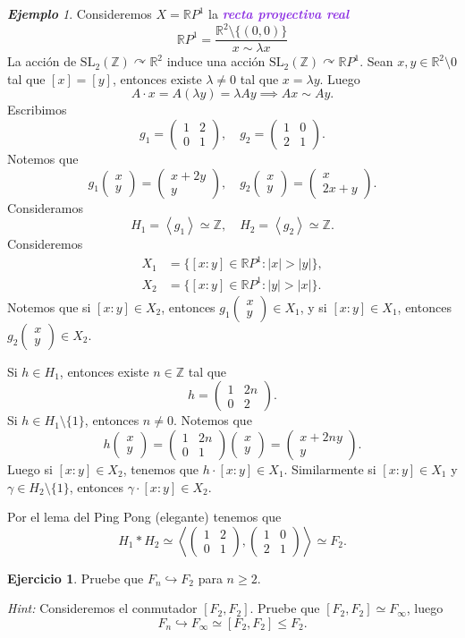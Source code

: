 \documentclass{article}
\theoremstyle{definition}
\newtheorem{exercise}{Ejercicio}
\theoremstyle{remark}
\newtheorem{example}[theorem]{\textbf{Ejemplo}}
\numberwithin{equation}{section}
\newcommand{\R}{\mathbb{R}}
\newcommand{\Z}{\mathbb{Z}}
\newcommand{\lam}{\lambda}
\newcommand{\oo}{\infty}
\newcommand{\embed}{\hookrightarrow}
\newcommand{\acts}{\curvearrowright}
\renewcommand{\c}{\cdot}
\newcommand{\SL}{\mathrm{SL}}
\newcommand{\abs}[1]{\left| #1 \right|}
\newcommand{\gen}[1]{\left\langle #1 \right\rangle}
\newcommand{\matr}[1]{\begin{pmatrix}#1\end{pmatrix}}
\newcommand{\wea}[1]{\textcolor{BlueViolet}{\textbf{\emph{#1}}}}
\begin{document}
\begin{example}
  Consideremos $X = \R P^1$ la \wea{recta proyectiva real}
  \[\R P^1 = \frac{\R^2 \setminus \{(0,0)\}}{x \sim \lam x}\]
  La acción de $\SL_2(\Z) \acts \R^2$ induce una acción $\SL_2(\Z) \acts \R P^1$. Sean $x,y \in \R^2 \setminus 0$ tal que $[x] = [y]$, entonces existe $\lam \neq 0$ tal que $x = \lam y$. Luego
  \[A \c x = A(\lam y) = \lam A y \implies Ax \sim Ay.\]
  Escribimos
  \[g_1 = \matr{1 & 2 \\ 0 & 1}, \quad g_2 = \matr{1 & 0 \\ 2 & 1}.\]
  Notemos que
  \[g_1 \matr{x \\ y} = \matr{x+2y \\ y}, \quad
  g_2 \matr{x \\ y} = \matr{x \\ 2x+y}.\]
  Consideramos
  \[H_1 = \gen{g_1} \simeq \Z, \quad
  H_2 = \gen{g_2} \simeq \Z.\]
  Consideremos
  \begin{align*}
    X_1 &= \{[x:y] \in \R P^1 : \abs x > \abs y\}, \\
    X_2 &= \{[x:y] \in \R P^1 : \abs y > \abs x\}.
  \end{align*}
  Notemos que si $[x:y] \in X_2$, entonces $g_1 \matr{x\\y} \in X_1$, y si $[x:y] \in X_1$, entonces $g_2 \matr{x\\y} \in X_2$.

  Si $h \in H_1$, entonces existe $n \in \Z$ tal que
  \[h = \matr{1 & 2n \\ 0 & 2}.\]
  Si $h \in H_1 \setminus \{1\}$, entonces $n \neq 0$. Notemos que
  \[h \matr{x\\y} = \matr{1 & 2n \\ 0 & 1} \matr{x\\y} = \matr{x + 2ny \\ y}.\]
  Luego si $[x:y] \in X_2$, tenemos que $h \c [x:y] \in X_1$. Similarmente si $[x:y] \in X_1$ y $\gamma \in H_2 \setminus \{1\}$, entonces $\gamma \c [x:y] \in X_2$.
  
  Por el lema del Ping Pong (elegante) tenemos que
  \[H_1 * H_2 \simeq \gen{\matr{1 & 2 \\ 0 & 1}, \matr{1 & 0 \\ 2 & 1}} \simeq F_2.\]
\end{example}

\begin{exercise}
  Pruebe que $F_n \embed F_2$ para $n \geq 2$.

  \emph{Hint:} Consideremos el conmutador $[F_2,F_2]$. Pruebe que $[F_2,F_2] \simeq F_\oo$, luego
  \[F_n \embed F_\oo \simeq [F_2,F_2] \leqslant F_2.\]
\end{exercise}
\end{document}
